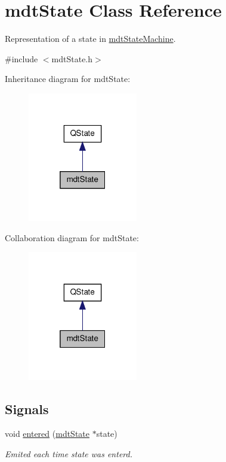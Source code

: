 \hypertarget{classmdt_state}{\section{mdt\-State Class Reference}
\label{classmdt_state}
}


Representation of a state in \hyperlink{classmdt_state_machine}{mdt\-State\-Machine}.  




{\ttfamily \#include $<$mdt\-State.\-h$>$}



Inheritance diagram for mdt\-State\-:\nopagebreak
\begin{figure}[H]
\begin{center}
\leavevmode
\includegraphics[width=136pt]{classmdt_state__inherit__graph}
\end{center}
\end{figure}


Collaboration diagram for mdt\-State\-:\nopagebreak
\begin{figure}[H]
\begin{center}
\leavevmode
\includegraphics[width=136pt]{classmdt_state__coll__graph}
\end{center}
\end{figure}
\subsection*{Signals}
\begin{DoxyCompactItemize}
\item 
void \hyperlink{classmdt_state_af439b403568bc41b3db70e037bfd8456}{entered} (\hyperlink{classmdt_state}{mdt\-State} $\ast$state)
\begin{DoxyCompactList}\small\item\em Emited each time state was enterd. \end{DoxyCompactList}\end{DoxyCompactItemize}
